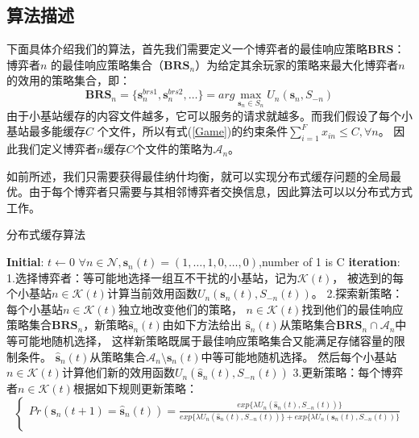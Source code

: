 \documentclass[bachelor]{seuthesis} %
\begin{document}
\begin{Main}
\subsection{算法描述}
下面具体介绍我们的算法，首先我们需要定义一个博弈者的最佳响应策略$\textbf{BRS}$：博弈者$n$ 的最佳响应策略集合（$\textbf{BRS}_n$）为给定其余玩家的策略来最大化博弈者$n$ 的效用的策略集合，即：
\begin{equation}
\textbf{BRS}_n=\{\textbf{s}_n^{brs1},\textbf{s}_n^{brs2},\dots\}=arg\max_{\textbf{s}_n\in S_n}U_n(\textbf{s}_n,S_{-n})
\end{equation}
由于小基站缓存的内容文件越多，它可以服务的请求就越多。而我们假设了每个小基站最多能缓存$C$ 个文件，所以有式(\ref{Game})的约束条件$\sum_{i=1}^Fx_{in}\leq C,\forall n$。 因此我们定义博弈者$n$缓存$C$个文件的策略为$\mathcal{A}_n$。\par
如前所述，我们只需要获得最佳纳什均衡，就可以实现分布式缓存问题的全局最优。由于每个博弈者只需要与其相邻博弈者交换信息，因此算法可以以分布式方式工作。
\begin{algorithm}
    \caption{分布式缓存算法}
    \begin{algorithmic}[1] %
       \State \textbf{Initial}:
       \State $t\gets0$
       \State $\forall n\in\mathcal{N},\textbf{s}_n(t)=(1,\dots,1,0,\dots,0)$,number of 1 is C
       \State \textbf{iteration}:
       \State 1.选择博弈者：等可能地选择一组互不干扰的小基站，记为$\mathcal{K}(t)$，
       \State 被选到的每个小基站$n\in\mathcal{K}(t)$计算当前效用函数$U_n(\textbf{s}_n(t),S_{-n}(t))$。
       \State 2.探索新策略：每个小基站$n\in\mathcal{K}(t)$独立地改变他们的策略，
       \State $n\in\mathcal{K}(t)$找到他们的最佳响应策略集合$\textbf{BRS}_n$，新策略$\hat{\textbf{s}}_n(t)$由如下方法给出
       \State $\hat{\textbf{s}}_n(t)$从策略集合$\textbf{BRS}_n\cap\mathcal{A}_n$中等可能地随机选择，
       \State 这样新策略既属于最佳响应策略集合又能满足存储容量的限制条件。
       \EndIf
       \State $\hat{\textbf{s}}_n(t)$从策略集合$\mathcal{A}_n\setminus\textbf{s}_n(t)$中等可能地随机选择。
       \EndIf
       \State 然后每个小基站$n\in\mathcal{K}(t)$计算他们新的效用函数$U_n(\hat{\textbf{s}}_n(t),S_{-n}(t))$
       \State 3.更新策略：每个博弈者$n\in\mathcal{K}(t)$根据如下规则更新策略：
       \begin{equation}
       \begin{cases}
        Pr(\textbf{s}_n(t+1)=\hat{\textbf{s}}_n(t))=\frac{exp\{\lambda U_n(\hat{\textbf{s}}_n(t),S_{-n}(t))\}}{exp\{\lambda U_n(\hat{\textbf{s}}_n(t),S_{-n}(t))\}+exp\{\lambda U_n(\textbf{s}_n(t),S_{-n}(t))\}}\\

\end{cases}
\end{equation}
\end{algorithmic}
\end{algorithm}
\end{Main}
\end{document}
